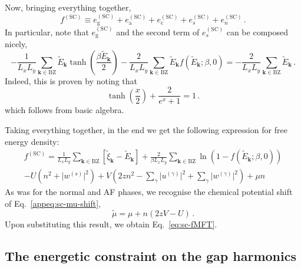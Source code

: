 \begin{tabproof}
\begin{enumerate}
\[		\]
	\end{enumerate}
	Now, bringing everything together,
	\[
	f^{(\mathrm{SC})} \equiv e_\mathrm{g}^{(\mathrm{SC})} + e_\mathrm{a}^{(\mathrm{SC})} + e_\mathrm{c}^{(\mathrm{SC})} + e_s^{(\mathrm{SC})} + e_n^{(\mathrm{SC})} \, .
	\]
	In particular, note that $e_\mathrm{g}^{(\mathrm{SC})}$ and the second term of $e_s^{(\mathrm{SC})}$ can be composed nicely,
	\[
	-\frac{1}{L_x L_y} \sum_{\mathbf{k} \in \mathrm{BZ}} \tilde{E}_\mathbf{k} \tanh(\frac{\beta \tilde{E}_\mathbf{k}}{2}) - \frac{2}{L_x L_y} \sum_{\mathbf{k}\in\mathrm{BZ}} \tilde{E}_\mathbf{k} f(\tilde{E}_\mathbf{k}; \beta,0) = - \frac{2}{L_x L_y} \sum_{\mathbf{k}\in\mathrm{BZ}} \tilde{E}_\mathbf{k} \, .
	\]
	Indeed, this is proven by noting that
	\[
	\tanh(\frac{x}{2}) + \frac{2}{e^x + 1} = 1 \, .
	\]
	which follows from basic algebra.
	
	Taking everything together, in the end we get the following expression for free energy density:
	\begin{multline*}
		f^{(\mathrm{SC})} = \frac{1}{L_x L_y} \sum_{\mathbf{k} \in \mathrm{BZ}} \left[
		\tilde{\xi}_\mathbf{k} - \tilde{E}_\mathbf{k}
		\right] + \frac{2}{\beta L_x L_y} \sum_{\mathbf{k}\in\mathrm{BZ}} \ln \left(
		1- f( \tilde{E}_\mathbf{k}; \beta,0) 
		\right) \\
		-U \left(
		n^2 + \big|
		w^{(s)}
		\big|^2
		\right) + V \left(
		2zn^2 - \sum_\gamma \big|
		u^{(\gamma)}
		\big|^2 + \sum_\gamma \big|
		w^{(\gamma)}
		\big|^2
		\right) + \mu n
	\end{multline*}
	As was for the normal and AF phases, we recognise the chemical potential shift of Eq.~\eqref{appeq:sc-mu-shift},
	\[
	\tilde{\mu} = \mu + n(2zV-U) \, .
	\]
	Upon substituting this result, we obtain Eq.~\eqref{eq:sc-fMFT}.
	
\end{tabproof}

\subsection{The energetic constraint on the gap harmonics}\label{appsubsec:sc-w^s-constraint}

